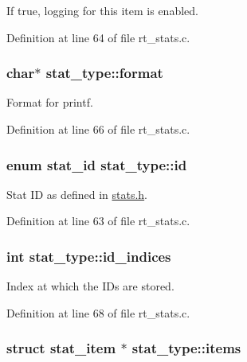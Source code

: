 If true, logging for this item is enabled. 



Definition at line 64 of file rt\-\_\-stats.\-c.

\hypertarget{structstat__type_afb56fba8ca558f25ae9e89192430381e}{
\subsubsection[{format}]{\setlength{\rightskip}{0pt plus 5cm}char$\ast$ stat\-\_\-type\-::format}}\label{structstat__type_afb56fba8ca558f25ae9e89192430381e}


Format for printf. 



Definition at line 66 of file rt\-\_\-stats.\-c.

\hypertarget{structstat__type_a6ad1dba35c226756f00d7d14f4615d8a}{
\subsubsection[{id}]{\setlength{\rightskip}{0pt plus 5cm}enum {\bf stat\-\_\-id} stat\-\_\-type\-::id}}\label{structstat__type_a6ad1dba35c226756f00d7d14f4615d8a}


Stat I\-D as defined in \hyperlink{stats_8h}{stats.\-h}. 



Definition at line 63 of file rt\-\_\-stats.\-c.

\hypertarget{structstat__type_a8960781cdec87c113b60ddf11dd4fab2}{
\subsubsection[{id\-\_\-indices}]{\setlength{\rightskip}{0pt plus 5cm}int stat\-\_\-type\-::id\-\_\-indices}}\label{structstat__type_a8960781cdec87c113b60ddf11dd4fab2}


Index at which the I\-Ds are stored. 



Definition at line 68 of file rt\-\_\-stats.\-c.

\hypertarget{structstat__type_a15ccf932c19f6e6b07a3575a956cfacd}{
\subsubsection[{items}]{\setlength{\rightskip}{0pt plus 5cm}struct {\bf stat\-\_\-item} $\ast$ stat\-\_\-type\-::items}}\label{structstat__type_a15ccf932c19f6e6b07a3575a956cfacd}


